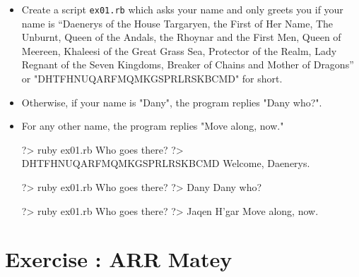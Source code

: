 \documentclass{42-en}
\begin{document}
\begin{itemize}

\item Create a script \texttt{ex01.rb} which asks your name and only greets you if your name is “Daenerys of the House Targaryen, the First of Her Name, The Unburnt, Queen of the Andals, the Rhoynar and the First Men, Queen of Meereen, Khaleesi of the Great Grass Sea, Protector of the Realm, Lady Regnant of the Seven Kingdoms, Breaker of Chains and Mother of Dragons” or "DHTFHNUQARFMQMKGSPRLRSKBCMD" for short. 
\item Otherwise, if your name is "Dany", the program replies "Dany who?". 
\item For any other name, the program replies "Move along, now."

\begin{42console}
	?> ruby ex01.rb
	Who goes there?
	?> DHTFHNUQARFMQMKGSPRLRSKBCMD
	Welcome, Daenerys.
\end{42console}

\begin{42console}
	?> ruby ex01.rb
	Who goes there?
	?> Dany
	Dany who?
\end{42console}

\begin{42console}
	?> ruby ex01.rb
	Who goes there?
	?> Jaqen H'gar
	Move along, now.
\end{42console}

\end{itemize}


\chapter{Exercise \exercicenumber: ARR Matey}

\exnumber{\exercicenumber}

\makeheaderfiles
\end{document}
